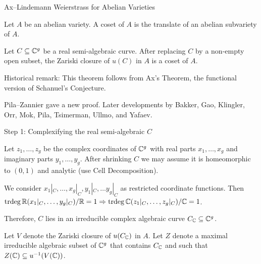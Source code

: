 \documentclass{beamer}
\begin{document}
\begin{frame}{Ax--Lindemann Weierstrass for Abelian Varieties}
  \begin{definition}
    Let $A$ be an abelian variety. A \alert{coset} of $A$ is the translate of an
    abelian subvariety of $A$. 
  \end{definition}

  \begin{theorem}
    Let $C\subseteq{\mathbb{C}}^g$ be a real semi-algebraic curve. After replacing
    $C$ by a non-empty open subset, the Zariski
    closure of $u(C)$ in $A$ is a coset of $A$.
  \end{theorem}

  Historical remark: This theorem follows from Ax's Theorem, the
  functional version of Schanuel's Conjecture. 
  
  Pila--Zannier gave a new proof. Later developments by Bakker, Gao, Klingler,
  Orr, Mok, Pila,
  Tsimerman, Ullmo, and Yafaev.
\end{frame}


\begin{frame}{Step 1: Complexifying the real semi-algebraic $C$}
  
  Let $z_1,\ldots,z_g$ be the complex coordinates of ${\mathbb{C}}^g$ with real
  parts $x_1,\ldots,x_g$ and imaginary parts $y_1,\ldots,y_g$. 
  After shrinking $C$ we may assume it is homeomorphic to
  $(0,1)$ and analytic (use Cell Decomposition).

  We consider $x_1|_{C},\ldots,{x_g}|_C,{y_1}|_C,\ldots
  y_g|_{C}$ as restricted coordinate functions.
  Then
  $\mathrm{trdeg}\,{\mathbb{R}}({x_1}|_C,\ldots,{y_g}|_C)/{\mathbb{R}}=1\Rightarrow
  \mathrm{trdeg}\,{\mathbb{C}}({z_1}|_C,\ldots,{z_g}|_C)/{\mathbb{C}}=1$.

  Therefore, $C$
  lies in an irreducible complex algebraic curve $C_{{\mathbb{C}}}\subseteq{\mathbb{C}}^g$. 

  Let $V$ denote the Zariski closure of $u(C_{\mathbb{C}})$ in $A$. Let $Z$
  denote a maximal irreducible algebraic subset of ${\mathbb{C}}^g$ that contains $C_{{\mathbb{C}}}$
  and such that $Z({\mathbb{C}})\subseteq u^{-1}(V({\mathbb{C}}))$. 
\end{frame}
\end{document}
